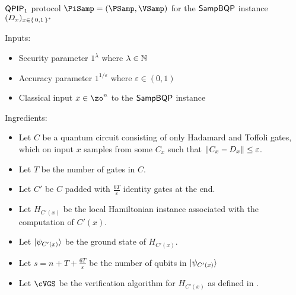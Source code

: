 \begin{protocol}{$\operatorname{\mathsf{QPIP}}_1$ protocol $\PiSamp=(\PSamp, \VSamp)$ for the $\operatorname{\mathsf{SampBQP}}$ instance $(D_x)_{x\in\set{0, 1}^*}$}
	\label{ProtoQPIP1}

	Inputs:
	\begin{itemize}
		\item Security parameter $1^\lambda$ where $\lambda\in\mathbb{N}$
		\item Accuracy parameter $1^{1/\varepsilon}$ where $\varepsilon\in(0, 1)$
		\item Classical input $x\in\zo^n$ to the $\operatorname{\mathsf{SampBQP}}$ instance
	\end{itemize}

	Ingredients:
	\begin{itemize}
		\item Let $C$ be a quantum circuit consisting of only Hadamard and Toffoli gates, which on input $x$ samples from some $C_x$ such that $\left\lVert C_x-D_x\right\rVert\leq\varepsilon$.
		\item Let $T$ be the number of gates in $C$.
		\item Let $C'$ be $C$ padded with $\frac{6T}{\varepsilon}$ identity gates at the end.
		\item Let $H_{C'(x)}$ be the local Hamiltonian instance associated with the computation of $C'(x)$. 
		\item Let $\ket{\psi_{C'(x)}}$ be the ground state of $H_{C'(x)}$.
		\item Let $s=n+T+\frac{6T}{\varepsilon}$ be the number of qubits in $\ket{\psi_{C'(x)}}$
		\item Let $\cVGS$ be the verification algorithm for $H_{C'(x)}$ as defined in .
	\end{itemize}


\end{protocol}
